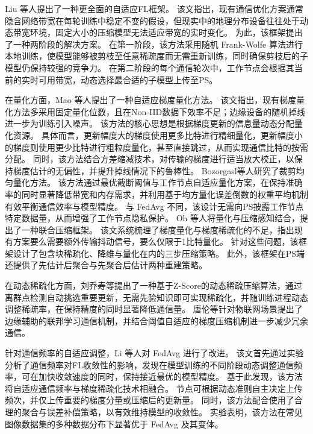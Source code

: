 \documentclass[master, vlined]{DissertUESTC}
\begin{document}
	Liu 等人提出了一种更全面的自适应FL框架。
	该文指出，现有通信优化方案通常隐含网络带宽在每轮训练中稳定不变的假设，但现实中的地理分布设备往往处于动态带宽环境，固定大小的压缩模型无法适应带宽的实时变化。
	为此，该框架提出了一种两阶段的解决方案。
	在第一阶段，该方法采用随机 Frank-Wolfe 算法进行本地训练，使模型能够被剪枝至任意稀疏度而无需重新训练，同时确保剪枝后的子模型仍保持较强的竞争力。
	在第二阶段的每个通信轮次中，工作节点会根据其当前的实时可用带宽，动态选择最合适的子模型上传至PS。

	在量化方面，Mao 等人提出了一种自适应梯度量化方法。
	该文指出，现有梯度量化方法多采用固定量化位数，且在Non-IID数据下效率不足；边缘设备的随机掉线进一步为训练引入噪声。
	该方法的核心思想是根据梯度更新的信息量动态分配量化资源。
	具体而言，更新幅度大的梯度使用更多比特进行精细量化，更新幅度小的梯度则使用更少比特进行粗粒度量化，甚至直接跳过，从而实现通信比特的按需分配。
	同时，该方法结合方差缩减技术，对传输的梯度进行适当放大校正，以保持梯度估计的无偏性，并提升掉线情况下的鲁棒性。
	Bozorgasl等人研究了裁剪均匀量化方法。
	该方法通过最优截断阈值与工作节点自适应量化方案，在保持准确率的同时显著降低带宽和内存需求，并利用基于均方量化误差倒数的权重平均机制有效平衡通信效率与模型精度。
	与 FedAvg 不同，该设计无需向PS披露工作节点特定数据量，从而增强了工作节点隐私保护。
	Oh 等人将量化与压缩感知结合，提出了一种联合压缩框架。
	该文系统梳理了梯度量化与梯度稀疏化的不足，指出现有方案要么需要额外传输抖动信号，要么仅限于1比特量化。
	针对这些问题，该框架设计了包含块稀疏化、降维与量化在内的三步压缩策略。
	此外，该框架在PS端还提供了先估计后聚合与先聚合后估计两种重建策略。

	在动态稀疏化方面，刘乔寿等提出了一种基于Z-Score的动态稀疏压缩算法，通过离群点检测自动挑选重要更新，无需先验知识即可实现稀疏化，并随训练进程动态调整稀疏率，在保持精度的同时显著降低通信量。
	唐伦等针对物联网场景提出了边缘辅助的联邦学习通信机制，并结合阈值自适应的梯度压缩机制进一步减少冗余通信。

	针对通信频率的自适应调整，Li 等人对 FedAvg 进行了改进。
	该文首先通过实验分析了通信频率对FL收敛性的影响，发现在模型训练的不同阶段动态调整通信频率，可在加快收敛速度的同时，保持接近最优的模型精度。
	基于此发现，该方法将自适应通信频率与梯度稀疏化技术相融合。
	节点可根据动态准则自主决定上传频次，并仅上传重要的梯度分量或压缩后的更新量。
	同时，该方法配合使用了合理的聚合与误差补偿策略，以有效维持模型的收敛性。
	实验表明，该方法在常见图像数据集的多种数据分布下显著优于 FedAvg 及其变体。
\end{document}
